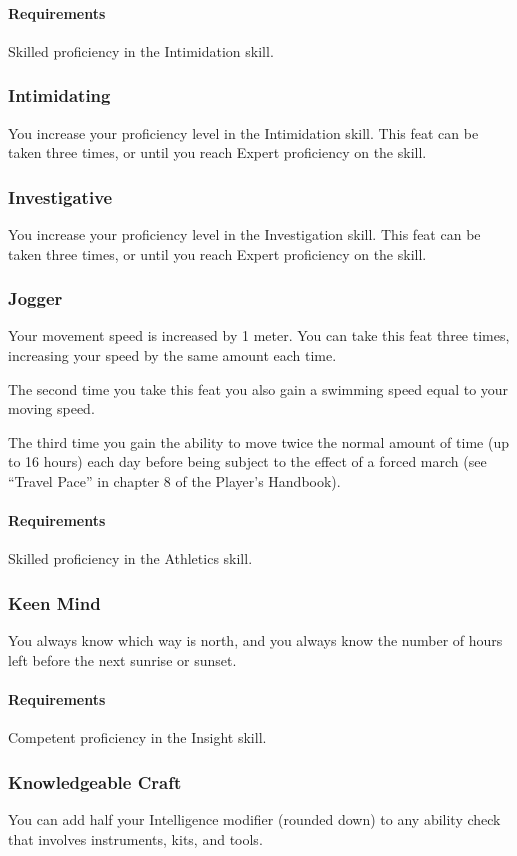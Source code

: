     \paragraph{Requirements} Skilled proficiency in the Intimidation skill.
\subsubsection{Intimidating} \label{feat::intimidating}
    You increase your proficiency level in the Intimidation skill.
    This feat can be taken three times, or until you reach Expert proficiency on the skill.
\subsubsection{Investigative} \label{feat::investigative}
    You increase your proficiency level in the Investigation skill.
    This feat can be taken three times, or until you reach Expert proficiency on the skill.
\subsubsection{Jogger} \label{feat::jogger}
    Your movement speed is increased by 1 meter.
    You can take this feat three times, increasing your speed by the same amount each time.

    The second time you take this feat you also gain a swimming speed equal to your moving speed.

    The third time you gain the ability to move twice the normal amount of time (up to 16 hours) each day before being subject to the effect of a forced march (see ``Travel Pace'' in chapter 8 of the Player's Handbook).
    \paragraph{Requirements} Skilled proficiency in the Athletics skill.
\subsubsection{Keen Mind} \label{feat::keenmind}
    You always know which way is north, and you always know the number of hours left before the next sunrise or sunset.
    \paragraph{Requirements} Competent proficiency in the Insight skill.
\subsubsection{Knowledgeable Craft} \label{feat::knowledgeablecraft}
    You can add half your Intelligence modifier (rounded down) to any ability check that involves instruments, kits, and tools.
